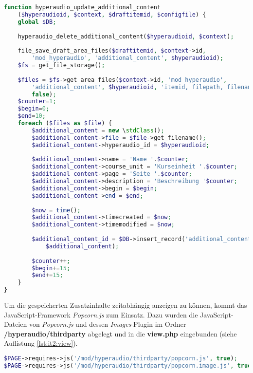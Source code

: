 \begin{lstlisting}[language=php,
             linewidth=\textwidth,
             caption={Ausschnitt der \textbf{locallib.php} in der 2. Iteration},
             label={lst:it2:locallib}]
function hyperaudio_update_additional_content
    ($hyperaudioid, $context, $draftitemid, $configfile) {
    global $DB;
    
    hyperaudio_delete_additional_content($hyperaudioid, $context);
    
    file_save_draft_area_files($draftitemid, $context->id,
        'mod_hyperaudio', 'additional_content', $hyperaudioid);
    $fs = get_file_storage();
    
    $files = $fs->get_area_files($context->id, 'mod_hyperaudio',
        'additional_content', $hyperaudioid, 'itemid, filepath, filename',
        false);
    $counter=1;
    $begin=0;
    $end=10;
    foreach ($files as $file) {        
        $additional_content = new \stdClass();
        $additional_content->file = $file->get_filename();
        $additional_content->hyperaudio_id = $hyperaudioid;
        
        $additional_content->name = 'Name '.$counter;
        $additional_content->course_unit = 'Kurseinheit '.$counter;
        $additional_content->page = 'Seite '.$counter;
        $additional_content->description = 'Beschreibung '$counter;
        $additional_content->begin = $begin;
        $additional_content->end = $end;
        
        $now = time();
        $additional_content->timecreated = $now;
        $additional_content->timemodified = $now;
        
        $additional_content_id = $DB->insert_record('additional_content',
            $additional_content);
		
        $counter++;
        $begin+=15;
        $end+=15;
    }
}
\end{lstlisting}

Um die gespeicherten Zusatzinhalte zeitabhängig anzeigen zu können, kommt das JavaScript-Framework \textit{Popcorn.js} zum Einsatz. Dazu wurden die JavaScript-Dateien von \textit{Popcorn.js} und dessen \textit{Images}-Plugin im Ordner \textbf{/hyperaudio/thirdparty} abgelegt und in die \textbf{view.php} eingebunden (siehe Auflistung \ref{lst:it2:view}).

\begin{lstlisting}[language=php,
             linewidth=\textwidth,
             caption={Ausschnitt der \textbf{view.php} in der 2. Iteration},
             label={lst:it2:view}]
$PAGE->requires->js('/mod/hyperaudio/thirdparty/popcorn.js', true);
$PAGE->requires->js('/mod/hyperaudio/thirdparty/popcorn.image.js', true);
\end{lstlisting}

